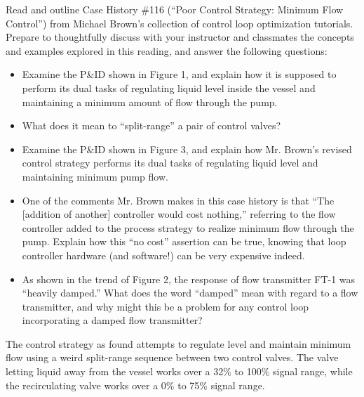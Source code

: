 

Read and outline Case History \#116 (``Poor Control Strategy: Minimum Flow Control'') from Michael Brown's collection of control loop optimization tutorials.  Prepare to thoughtfully discuss with your instructor and classmates the concepts and examples explored in this reading, and answer the following questions:

\begin{itemize}
\item{} Examine the P\&ID shown in Figure 1, and explain how it is supposed to perform its dual tasks of regulating liquid level inside the vessel and maintaining a minimum amount of flow through the pump.
\vskip 10pt
\item{} What does it mean to ``split-range'' a pair of control valves?
\vskip 10pt
\item{} Examine the P\&ID shown in Figure 3, and explain how Mr. Brown's revised control strategy performs its dual tasks of regulating liquid level and maintaining minimum pump flow.
\vskip 10pt
\item{} One of the comments Mr. Brown makes in this case history is that ``The [addition of another] controller would cost nothing,'' referring to the flow controller added to the process strategy to realize minimum flow through the pump.  Explain how this ``no cost'' assertion can be true, knowing that loop controller hardware (and software!) can be very expensive indeed.
\vskip 10pt
\item{} As shown in the trend of Figure 2, the response of flow transmitter FT-1 was ``heavily damped.''  What does the word ``damped'' mean with regard to a flow transmitter, and why might this be a problem for any control loop incorporating a damped flow transmitter?
\end{itemize}














The control strategy as found attempts to regulate level and maintain minimum flow using a weird split-range sequence between two control valves.  The valve letting liquid away from the vessel works over a 32\% to 100\% signal range, while the recirculating valve works over a 0\% to 75\% signal range.

